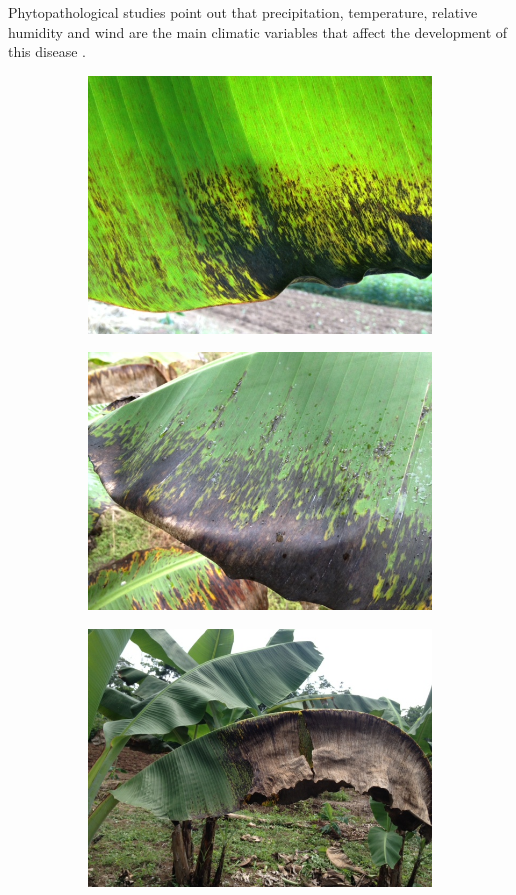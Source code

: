 \documentclass[review]{elsarticle}
\begin{document}
Phytopathological studies point out that precipitation, temperature,
relative humidity and wind are the main climatic variables that affect
the development of this disease \citep{MarinVargas1995}.
 	 
\begin{figure}[h] 
\begin{subfigure}{.3\textwidth}
  \centering
  \includegraphics[width=.8\linewidth]{Roya_a}
  \caption{}
  \label{fig:sfig1}
\end{subfigure}
\begin{subfigure}{.3\textwidth}
  \centering
  \includegraphics[width=.8\linewidth]{Roya_b}
  \caption{}
  \label{fig:sfig2}
\end{subfigure}
\begin{subfigure}{.3\textwidth}
  \centering
  \includegraphics[width=.8\linewidth]{Roya_c}

\end{subfigure}
\end{figure}
\end{document}
